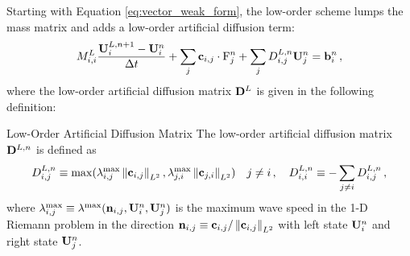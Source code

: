 Starting with Equation \eqref{eq:vector_weak_form}, the low-order scheme
lumps the mass matrix and adds a low-order artificial diffusion term:
    \begin{equation}
      \lumpedmassentry
        \frac{\solutionvector_i^{L,n+1}-\solutionvector_i^n}{\dt}
        + \sum_j\gradiententry\cdot\consfluxinterpolant_j^n
        + \sum_j\diffusionmatrixletter\ij^{L,n}\solutionvector_j^n
        = \ssrhs_i^n \eqc
    \end{equation}
where the low-order artificial diffusion matrix $\loworderdiffusionmatrix$
is given in the following definition:
\begin{definition}{Low-Order Artificial Diffusion Matrix}
   The low-order artificial diffusion matrix $\loworderdiffusionmatrix[\timeindex]$
   is defined as
    \begin{equation}
      \diffusionmatrixletter^{L,n}\ij \equiv
        \max(\maxwavespeed\ij\ltwonorm{\mathbf{\gradientmatrixletter}\ij},
          \maxwavespeed\ji\ltwonorm{\mathbf{\gradientmatrixletter}\ji})
      \quad j\ne i \eqc \quad
      \diffusionmatrixletter^{L,n}_{i,i} \equiv
        -\sumjnoti\diffusionmatrixletter^{L,n}\ij
      \eqc
   \end{equation}
   where $\maxwavespeed\ij \equiv \maxwavespeed(
   \normalvector\ij,\solutionvector_i^n,\solutionvector_j^n)$
   is the maximum wave speed in the 1-D Riemann problem in the direction
   $\mathbf{n}_{i,j} \equiv \mathbf{c}_{i,j} /
   \left\|\mathbf{c}_{i,j}\right\|_{L^2}$
   with left state $\mathbf{U}_i^n$ and right state $\mathbf{U}_j^n$.
\end{definition}
